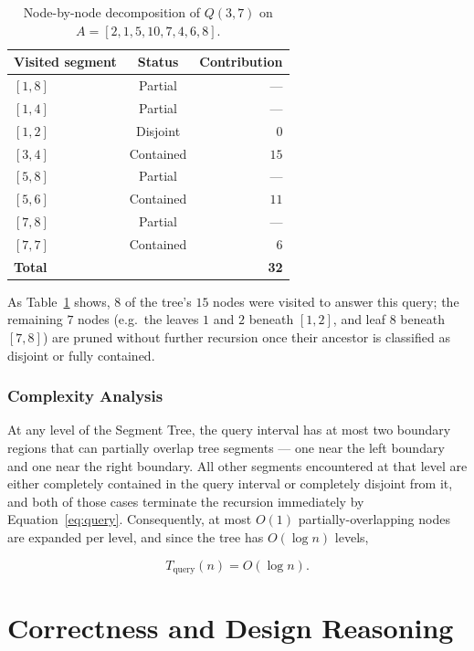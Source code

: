 \documentclass[11pt,open=any,headings=option]{scrreprt}
\begin{document}
\begin{table}[h]
\centering
\caption{Node-by-node decomposition of $Q(3,7)$ on $A=[2,1,5,10,7,4,6,8]$.}
\label{tab:decomp}
\begin{tabular}{lcr}
\toprule
\textbf{Visited segment} & \textbf{Status} & \textbf{Contribution} \\
\midrule
$[1,8]$ & Partial   & --- \\
$[1,4]$ & Partial   & --- \\
$[1,2]$ & Disjoint  & $0$ \\
$[3,4]$ & Contained & $15$ \\
$[5,8]$ & Partial   & --- \\
$[5,6]$ & Contained & $11$ \\
$[7,8]$ & Partial   & --- \\
$[7,7]$ & Contained & $6$ \\
\midrule
\textbf{Total} & & \textbf{32} \\
\bottomrule
\end{tabular}
\end{table}

As Table~\ref{tab:decomp} shows, $8$ of the tree's $15$ nodes were visited to answer this query; the remaining $7$ nodes (e.g.\ the leaves $1$ and $2$ beneath $[1,2]$, and leaf $8$ beneath $[7,8]$) are pruned without further recursion once their ancestor is classified as disjoint or fully contained.

\subsection{Complexity Analysis}
\label{sec:overlap-argument}
At any level of the Segment Tree, the query interval has at most two boundary regions that can partially overlap tree segments --- one near the left boundary and one near the right boundary. All other segments encountered at that level are either completely contained in the query interval or completely disjoint from it, and both of those cases terminate the recursion immediately by Equation~\eqref{eq:query}. Consequently, at most $O(1)$ partially-overlapping nodes are expanded per level, and since the tree has $O(\log n)$ levels,

\begin{equation}
\boxed{T_{\text{query}}(n) = O(\log n)}.
\end{equation}

\chapter{Correctness and Design Reasoning}
\end{document}
